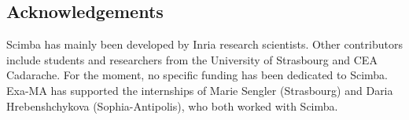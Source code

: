 


\subsection{Acknowledgements}
\label{sec::Scimba:acknowledgements}

Scimba has mainly been developed by Inria research scientists.
Other contributors include students and researchers
from the University of Strasbourg and CEA Cadarache.
For the moment, no specific funding has been dedicated to Scimba.
Exa-MA has supported the internships of Marie Sengler (Strasbourg) and Daria Hrebenshchykova (Sophia-Antipolis), who both worked with Scimba.

